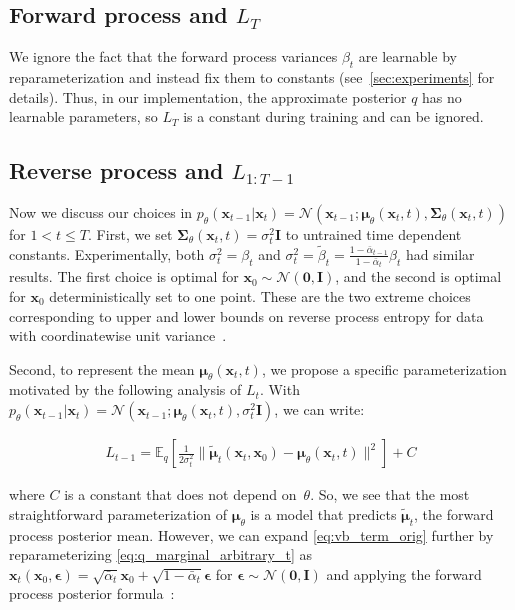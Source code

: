 \subsection[Forward process]{Forward process and $L_T$} We ignore the fact that the forward process variances $\beta_t$ are learnable by reparameterization and instead fix them to constants (see~\ref{sec:experiments} for details). Thus, in our implementation, the approximate posterior $q$ has no learnable parameters, so $L_T$ is a constant during training and can be ignored.

\subsection[Reverse process]{Reverse process and  $L_{1:T-1}$} \label{sec:revproc_dsm_diffusion_connection}
Now we discuss our choices in $p_\theta(\mathbf{x}_{t-1}|\mathbf{x}_t) = \mathcal{N}(\mathbf{x}_{t-1}; {\boldsymbol{\mu}}_\theta(\mathbf{x}_t, t), {\boldsymbol{\Sigma}}_\theta(\mathbf{x}_t, t))$ for ${1 < t \leq T}$. First, we set ${\boldsymbol{\Sigma}}_\theta(\mathbf{x}_t, t) = \sigma_t^2 \mathbf{I}$ to untrained time dependent constants. Experimentally, both $\sigma_t^2 = \beta_t$ and $\sigma_t^2 = \tilde\beta_t = \frac{1-\bar\alpha_{t-1}}{1-\bar\alpha_t}\beta_t$ had similar results. The first choice is optimal for $\mathbf{x}_0 \sim \mathcal{N}(\mathbf{0}, \mathbf{I})$, and the second is optimal for $\mathbf{x}_0$ deterministically set to one point. These are the two extreme choices corresponding to upper and lower bounds on reverse process entropy for data with coordinatewise unit variance~\citep{sohl2015deep}.

Second, to represent the mean ${\boldsymbol{\mu}}_\theta(\mathbf{x}_t, t)$, we propose a specific parameterization motivated by the following analysis of $L_t$. With $p_\theta(\mathbf{x}_{t-1} | \mathbf{x}_t) = \mathcal{N}(\mathbf{x}_{t-1}; {\boldsymbol{\mu}}_\theta(\mathbf{x}_t, t), \sigma_t^2\mathbf{I})$, we can write:

\begin{align}
  L_{t-1} = \mathbb{E}_{q}\!\left[ \frac{1}{2\sigma_t^2} \|\tilde{\boldsymbol{\mu}}_t(\mathbf{x}_t,\mathbf{x}_0) - {\boldsymbol{\mu}}_\theta(\mathbf{x}_t, t)\|^2 \right] + C \label{eq:vb_term_orig}
\end{align}

where $C$ is a constant that does not depend on~$\theta$. So, we see that the most straightforward parameterization of ${\boldsymbol{\mu}}_\theta$ is a model that predicts $\tilde{\boldsymbol{\mu}}_t$, the forward process posterior mean. However, we can expand \ref{eq:vb_term_orig} further by reparameterizing \ref{eq:q_marginal_arbitrary_t} as $\mathbf{x}_t(\mathbf{x}_0, {\boldsymbol{\epsilon}}) = \sqrt{\bar\alpha_t}\mathbf{x}_0 + \sqrt{1-\bar\alpha_t}{\boldsymbol{\epsilon}}$ for ${\boldsymbol{\epsilon}} \sim \mathcal{N}(\mathbf{0}, \mathbf{I})$ and applying the forward process posterior formula~:

